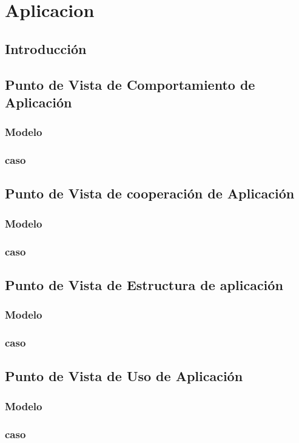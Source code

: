 \chapter{Aplicacion}

\section{Introducción}

\section{Punto de Vista de Comportamiento de Aplicación}

\subsection{Modelo}

\newpage

\subsection{caso}

\newpage

\section{Punto de Vista de cooperación de Aplicación}

\subsection{Modelo}

\newpage

\subsection{caso}

\newpage

\section{Punto de Vista de Estructura de aplicación}

\subsection{Modelo}

\newpage

\subsection{caso}

\newpage

\section{Punto de Vista de Uso de Aplicación}

\subsection{Modelo}

\newpage

\subsection{caso}

\newpage

